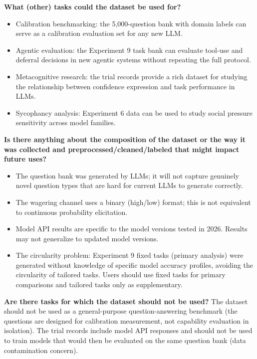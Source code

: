\textbf{What (other) tasks could the dataset be used for?}
\begin{itemize}
  \item Calibration benchmarking: the 5,000-question bank with domain labels can serve
    as a calibration evaluation set for any new LLM.
  \item Agentic evaluation: the Experiment 9 task bank can evaluate tool-use and
    deferral decisions in new agentic systems without repeating the full \mirror{} protocol.
  \item Metacognitive research: the trial records provide a rich dataset for studying
    the relationship between confidence expression and task performance in LLMs.
  \item Sycophancy analysis: Experiment 6 data can be used to study social pressure
    sensitivity across model families.
\end{itemize}

\textbf{Is there anything about the composition of the dataset or the way it was
collected and preprocessed/cleaned/labeled that might impact future uses?}
\begin{itemize}
  \item The question bank was generated by LLMs; it will not capture genuinely novel
    question types that are hard for current LLMs to generate correctly.
  \item The wagering channel uses a binary (high/low) format; this is not equivalent
    to continuous probability elicitation.
  \item Model API results are specific to the model versions tested in 2026. Results
    may not generalize to updated model versions.
  \item The circularity problem: Experiment 9 fixed tasks (primary analysis) were
    generated without knowledge of specific model accuracy profiles, avoiding the
    circularity of tailored tasks. Users should use fixed tasks for primary comparisons
    and tailored tasks only as supplementary.
\end{itemize}

\textbf{Are there tasks for which the dataset should not be used?}
The dataset should not be used as a general-purpose question-answering benchmark
(the questions are designed for calibration measurement, not capability evaluation
in isolation). The trial records include model API responses and should not be used
to train models that would then be evaluated on the same question bank (data
contamination concern).

